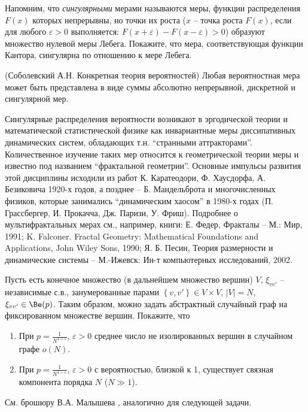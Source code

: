 \begin{problem}
Напомним, что \textit{сингулярными} мерами называются меры, функции распределения $F(x)$ которых непрерывны, но точки их роста ($x$ -- точка роста $F(x)$, если для любого $\varepsilon >0$ выполняется: $F(x+\varepsilon )-F(x-\varepsilon )>0$) образуют множество нулевой меры Лебега. Покажите, что мера, соответствующая функции Кантора, сингулярна по отношению к мере Лебега.

\end{problem}

\begin{remark} (Соболевский А.Н. Конкретная теория вероятностей)
Любая вероятностная мера может быть представлена в виде суммы абсолютно непрерывной, дискретной и сингулярной мер. 

Сингулярные распределения вероятности возникают в эргодической теории и математической статистической физике как инвариантные меры диссипативных динамических систем, обладающих т.н. ``странными аттракторами''. Количественное изучение таких мер относится к геометрической теории меры и известно под названием ``фрактальной геометрии''. Основные импульсы развития этой дисциплины исходили из работ К. Каратеодори, Ф. Хаусдорфа, А. Безиковича 1920-х годов, а позднее -- Б. Мандельброта и многочисленных физиков, которые занимались ``динамическим хаосом'' в 1980-х годах (П. Грассбергер, И. Прокачча, Дж. Паризи, У. Фриш). Подробнее о мультифрактальных мерах см., например, книги: Е. Федер, Фракталы -- М.: Мир, 1991; K. Falconer. Fractal Geometry: Mathematical Foundations and Applications, John Wiley  Sons, 1990; Я. Б. Песин, Теория размерности и динамические системы -- М.-Ижевск: Ин-т компьютерных исследований, 2002.

\end{remark} 


\begin{problem}
\label{sec:erdRenyi}
 Пусть есть конечное множество (в дальнейшем множество вершин) $V$, $\xi _{vv'} $ -- независимые с.в., занумерованные парами $\left\{v,v'\right\}\in V\times V$, $\vert V \vert = N$, $\xi _{vv'} \in \Be(p)$. 
Таким образом, можно задать абстрактный случайный граф на фиксированном множестве вершин. Покажите, что 
 
\begin{enumerate}
\item  При $p=\frac{1}{N^{1+\varepsilon } } $, $\varepsilon >0$ среднее число не изолированных вершин в случайном графе $o\left(N\right)$.
 
\item  При $p=\frac{1}{N^{1-\varepsilon } } $, $\varepsilon >0$ с вероятностью, близкой к 1, существует связная компонента порядка $N$ ($N \gg 1$).
\end{enumerate}
\end{problem}
 \begin{remark}
 См. брошюру В.А. Малышева \cite{27}, аналогично для следующей задачи.
 \end{remark}
 
